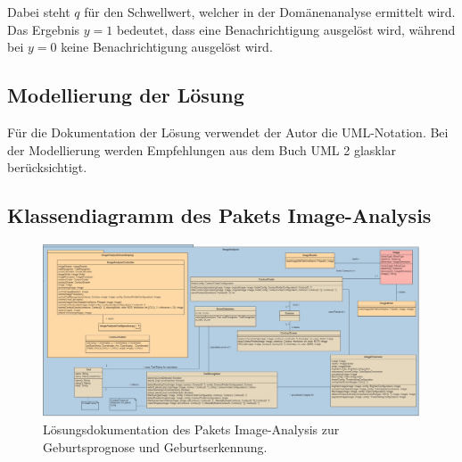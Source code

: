 Dabei steht $q$ für den Schwellwert, welcher in der Domänenanalyse ermittelt wird. Das Ergebnis $y=1$ bedeutet, dass eine Benachrichtigung ausgelöst wird, während bei $y=0$ keine Benachrichtigung ausgelöst wird.

 






\begin{landscape}

\section{Modellierung der Lösung}
Für die Dokumentation der Lösung verwendet der Autor die UML-Notation. Bei der Modellierung werden Empfehlungen aus dem Buch \flqq{}UML 2 glasklar\frqq{} \cite{Uml-modellierung2012} berücksichtigt. 

\subsection{Klassendiagramm des Pakets Image-Analysis }
\begin{figure}[H]
	\center
	\includegraphics[scale=1.35]{Grafiken/modelle/solution-imageanalysis-1.jpg}
	\caption{Lösungsdokumentation des Pakets Image-Analysis zur Geburtsprognose und Geburtserkennung.} 
	\label{fig: Lösungsdokumentation des Pakets Image-Analysis zur Geburtsprognose und Geburtserkennung.}
\end{figure}


\end{landscape}
